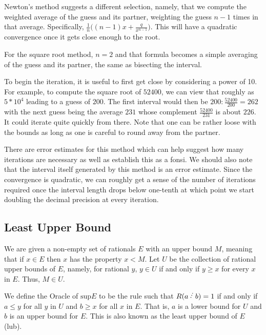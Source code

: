 \documentclass[12pt]{article}
\begin{document}
Newton's method suggests a different selection, namely, that we compute the weighted average of the guess and its partner, weighting the guess $n-1$ times in that average. Specifically, $\frac{1}{n} \big( (n-1) x + \frac{q}{x^{n-1}} \big)$. This will have a quadratic convergence once it gets close enough to the root.

For the square root method, $n=2$ and that formula becomes a simple averaging of the guess and its partner, the same as bisecting the interval.  

To begin the iteration, it is useful to first get close by considering a power of 10. For example, to compute the square root of $52400$, we can view that roughly as $5*10^4$ leading to a guess of $200$. The first interval would then be $200: \frac{52400}{200} = 262$ with the next guess being the average $231$ whose complement $\frac{52400}{231}$ is about $22 6$. It could iterate quite quickly from there. Note that one can be rather loose with the bounds as long as one is careful to round away from the partner.  

There are error estimates for this method which can help suggest how many iterations are necessary as well as establish this as a fonsi. We should also note that the interval itself generated by this method is an error estimate. Since the convergence is quadratic, we can roughly get a sense of the number of iterations required once the interval length drops below one-tenth at which point we start doubling the decimal precision at every iteration.  


\subsection{Least Upper Bound}

We are given a non-empty set of rationals $E$ with an upper bound $M$, meaning that if $x \in E$ then $x$ has the property $x < M$. Let $U$ be the collection of rational upper bounds of $E$, namely, for rational $y$, $y \in U$ if and only if $y \geq x$ for every $x$ in $E$.  Thus, $M \in U$.

We define the Oracle of $\mathrm{sup} E$ to be the rule such that $R(a\lte b) = 1$ if and only if $a \leq y$ for all $y$ in $U$ and $b \geq x$ for all $x$ in $E$. That is, $a$ is a lower bound for $U$ and $b$ is an upper bound for $E$. This is also known as the least upper bound of $E$ (lub).
\end{document}
